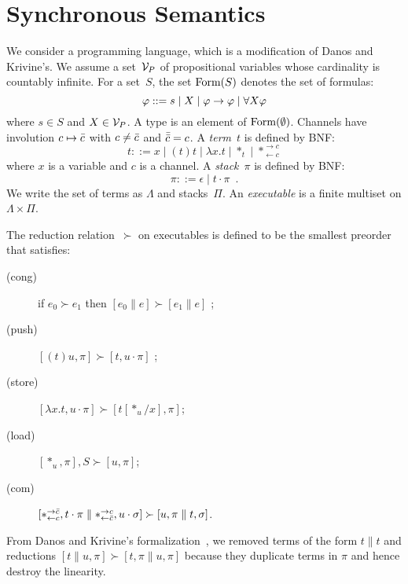 \section{Synchronous Semantics}


\newcommand{\conc}{\parallel}
\newcommand{\comod}[2]{\ast^{\rightarrow {#2}}_{\leftarrow{#1}}}
\newcommand{\reader}[1]{\ast_{\leftarrow{#1}}}

We consider a programming language, which is a modification of
Danos and Krivine's.
We assume a set~$\mathcal V_P$ of propositional variables whose cardinality is
countably infinite.
For a set~$S$,
the set $\mathop{\text{Form}}(S)$ denotes the set of formulas:
\[
\varphi::= s \mid X \mid \varphi\rightarrow\varphi\mid \forall X \varphi
\]
where $s\in S$ and $X\in \mathcal V_P$.
A type is an element of $\mathop{\text{Form}}(\emptyset)$.
Channels have involution $c\mapsto\bar{c}$ with
$c\neq \bar{c}$ and
$\bar{\bar{c}} = c$.
A \textit{term}~$t$ is defined by BNF:
\[
 t::= x
 \mid (t)t
 \mid \lambda x.t
 \mid \ast_t
 \mid \comod c c
\]
where $x$ is a variable and $c$ is a channel.
A \textit{stack}~$\pi$ is defined by BNF:
\[
 \pi ::= \epsilon
 \mid t\cdot \pi
 \enspace.
\]
We write the set of terms as $\Lambda$ and stacks~$\Pi$.
An \textit{executable} is a finite multiset on $\Lambda \times \Pi$.

\newcommand{\red}{\succ}
The reduction relation~$\red$ on executables
is defined to be the smallest preorder
that satisfies:
\begin{description}
 \item[(cong)] if
	    $e_0         \red e_1$
	    then
	    $[e_0 \conc e] \red [ e_1\conc e]$  \enspace;
 \item[(push)]
	    $[(t)u,\pi]      \red [t,u\cdot\pi]$      \enspace;
 \item[(store)]
	    $[\lambda x.t,u\cdot\pi]
	     \red
	     [t[\ast_u/x],      \pi]$\enspace;
 \item[(load)]
	    $[\ast_u,\pi],S\red[u,\pi]$\enspace;
 \item[(com)]
	    $[\comod c{\co c}, t\cdot\pi\conc \comod{\co c}c,
	    u\cdot\sigma] \red
	    [u,\pi\conc t,\sigma]$\enspace.
\end{description}
From Danos and Krivine's formalization~,
we removed terms of the form $ t\conc t $ and
reductions
	    $[t\conc u,\pi]  \red [t,\pi\conc u,\pi]$
because they duplicate terms in $\pi$ and hence destroy the linearity.

